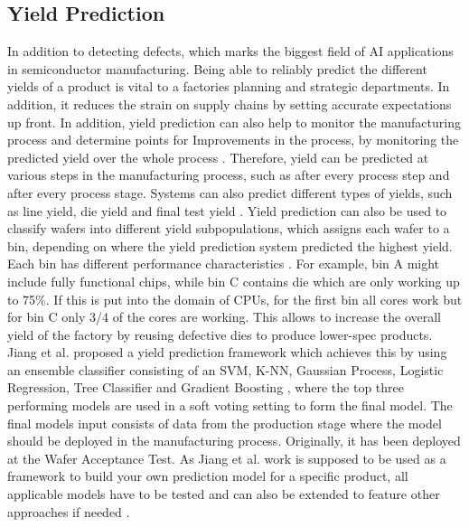 \documentclass{Academic}
\begin{document}
    \subsection{Yield Prediction}
    In addition to detecting defects, which marks the biggest field of AI applications in semiconductor manufacturing. Being able to reliably predict the different yields of a product is vital to a factories planning and strategic departments. In addition, it reduces the strain on supply chains by setting accurate expectations up front. In addition, yield prediction can also help to monitor the manufacturing process and determine points for Improvements in the process, by monitoring the predicted yield over the whole process \cite{noauthor_machine_nodate,jiang_novel_2020}. Therefore, yield can be predicted at various steps in the manufacturing process, such as after every process step and after every process stage. Systems can also predict different types of yields, such as line yield, die yield and final test yield \cite{noauthor_machine_nodate,jiang_novel_2020}. Yield prediction can also be used to classify wafers into different yield subpopulations, which assigns each wafer to a bin, depending on where the yield prediction system predicted the highest yield. Each bin has different performance characteristics \cite{jiang_novel_2020}. For example, bin A might include fully functional chips, while bin C contains die which are only working up to 75\%. If this is put into the domain of CPUs, for the first bin all cores work but for bin C only 3/4 of the cores are working. This allows to increase the overall yield of the factory by reusing defective dies to produce lower-spec products. Jiang et al. proposed a yield prediction framework which achieves this by using an ensemble classifier consisting of an SVM, K-NN, Gaussian Process, Logistic Regression, Tree Classifier and Gradient Boosting \cite{jiang_novel_2020}, where the top three performing models are used in a soft voting setting to form the final model. The final models input consists of data from the production stage where the model should be deployed in the manufacturing process. Originally, it has been deployed at the Wafer Acceptance Test. As Jiang et al. work is supposed to be used as a framework to build your own prediction model for a specific product, all applicable models have to be tested and can also be extended to feature other approaches if needed \cite{jiang_novel_2020}.
\end{document}
